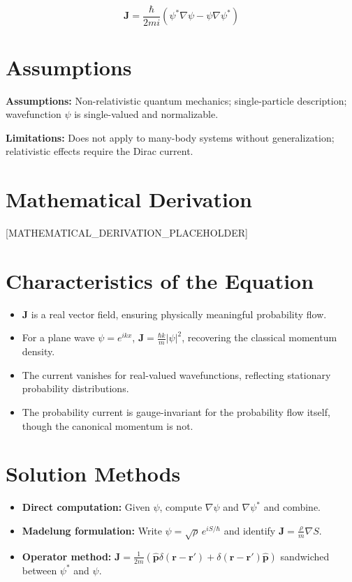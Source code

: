 \documentclass[11pt,openright]{book}
\begin{document}
\begin{equation}
\mathbf{J} = \frac{\hbar}{2mi}\left(\psi^*\nabla\psi - \psi\nabla\psi^*\right)
\end{equation}
\section*{Assumptions}

\textbf{Assumptions:} Non-relativistic quantum mechanics; single-particle description; wavefunction $\psi$ is single-valued and normalizable.


\textbf{Limitations:} Does not apply to many-body systems without generalization; relativistic effects require the Dirac current.


\section*{Mathematical Derivation}

[MATHEMATICAL_DERIVATION_PLACEHOLDER]

\section*{Characteristics of the Equation}

\begin{itemize}
    \item $\mathbf{J}$ is a real vector field, ensuring physically meaningful probability flow.
    \item For a plane wave $\psi = e^{ikx}$, $\mathbf{J} = \frac{\hbar k}{m}|\psi|^2$, recovering the classical momentum density.
    \item The current vanishes for real-valued wavefunctions, reflecting stationary probability distributions.
    \item The probability current is gauge-invariant for the probability flow itself, though the canonical momentum is not.
\end{itemize}
\section*{Solution Methods}

\begin{itemize}
    \item \textbf{Direct computation:} Given $\psi$, compute $\nabla\psi$ and $\nabla\psi^*$ and combine.
    \item \textbf{Madelung formulation:} Write $\psi = \sqrt{\rho}\,e^{iS/\hbar}$ and identify $\mathbf{J} = \frac{\rho}{m}\nabla S$.
    \item \textbf{Operator method:} $\mathbf{J} = \frac{1}{2m}(\hat{\mathbf{p}}\delta(\mathbf{r}-\mathbf{r}') + \delta(\mathbf{r}-\mathbf{r}')\hat{\mathbf{p}})$ sandwiched between $\psi^*$ and $\psi$.
\end{itemize}
\end{document}
